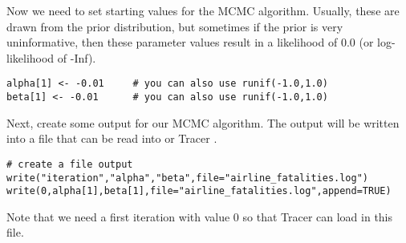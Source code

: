 Now we need to set starting values for the MCMC algorithm.
Usually, these are drawn from the prior distribution, but sometimes if the prior is very uninformative, then these parameter values result in a likelihood of 0.0 (or log-likelihood of -Inf).
{\tt \begin{snugshade*}
\begin{lstlisting}    
alpha[1] <- -0.01     # you can also use runif(-1.0,1.0)
beta[1] <- -0.01      # you can also use runif(-1.0,1.0)
\end{lstlisting}
\end{snugshade*}}
Next, create some output for our MCMC algorithm.
The output will be written into a file that can be read into \R or Tracer \citep{Rambaut2011}.
{\tt \begin{snugshade*}
\begin{lstlisting}    
# create a file output
write("iteration","alpha","beta",file="airline_fatalities.log")
write(0,alpha[1],beta[1],file="airline_fatalities.log",append=TRUE)
\end{lstlisting}
\end{snugshade*}}
Note that we need a first iteration with value 0 so that Tracer can load in this file.

